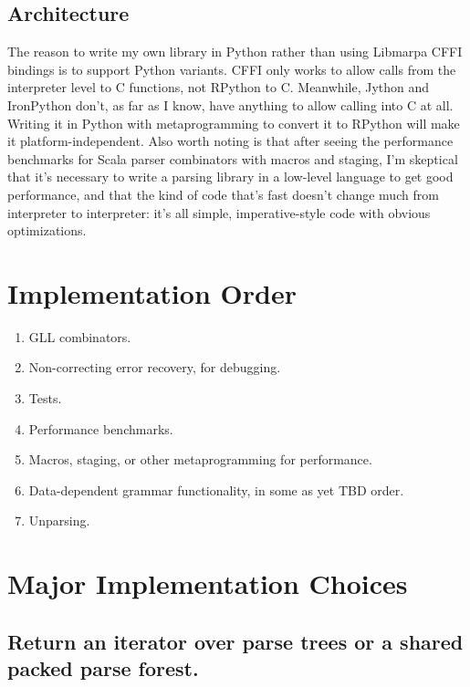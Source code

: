 \documentclass[12pt]{article}
\begin{document}
\subsection{Architecture}
\label{sec:architecture}

The reason to write my own library in Python rather than using
Libmarpa CFFI bindings is to support Python variants.  CFFI only works
to allow calls from the interpreter level to C functions, not RPython
to C.  Meanwhile, Jython and IronPython don't, as far as I know, have
anything to allow calling into C at all.  Writing it in Python with
metaprogramming to convert it to RPython will make it
platform-independent. Also worth noting is that after seeing the
performance benchmarks for Scala parser combinators with macros and
staging, I'm skeptical that it's necessary to write a parsing library
in a low-level language to get good performance, and that the kind of
code that's fast doesn't change much from interpreter to interpreter:
it's all simple, imperative-style code with obvious optimizations.


\section{Implementation Order}
\label{sec:implementation_order}

\begin{enumerate}
\item GLL combinators.
\item Non-correcting error recovery, for debugging.
\item Tests.
\item Performance benchmarks.
\item Macros, staging, or other metaprogramming for performance.
\item Data-dependent grammar functionality, in some as yet TBD order.
\item Unparsing.
\end{enumerate}


\section{Major Implementation Choices}
\label{sec:implementation_choices}

\subsection{Return an iterator over parse trees or a shared packed
  parse forest.}
\label{sec:iterator_sppf}
\end{document}
